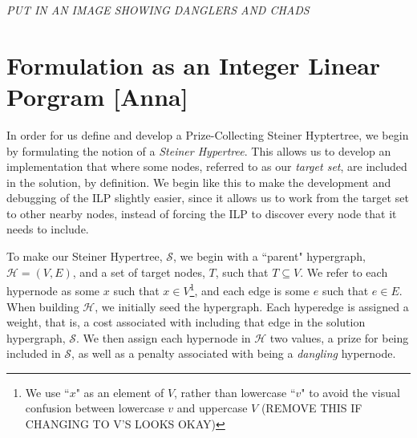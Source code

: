 \documentclass[12pt,twoside]{reedthesis}
\newcommand{\new}[2]{{\color{orange}#1 [#2]}}
\theoremstyle{definition}
\begin{document}
\textit{PUT IN AN IMAGE SHOWING DANGLERS AND CHADS}

\chapter{Formulation \new{as an Integer Linear Porgram}{Anna}}

In order for us define and develop a Prize-Collecting Steiner Hyptertree, we begin by formulating the notion of a \textit{Steiner Hypertree}. This allows us to develop an implementation that where some nodes, referred to as our \textit{target set}, are included in the solution, by definition. We begin like this to make the development and debugging of the ILP slightly easier, since it allows us to work from the target set to other nearby nodes, instead of forcing the ILP to discover every node that it needs to include.\par
To make our Steiner Hypertree, $\mathcal{S}$, we begin with a ``parent" hypergraph, $\mathcal{H} = (V,E)$, and a set of target nodes, $T$, such that $T \subseteq V$.  We refer to each hypernode as some $x$ such that $x \in V$\footnote{We use ``$x$" as an element of $V$, rather than lowercase ``$v$" to avoid the visual confusion between lowercase $v$ and uppercase $V$ (REMOVE THIS IF CHANGING TO V'S LOOKS OKAY)}, and each edge is some $e$ such that $e \in E$.  When building $\mathcal{H}$, we initially seed the hypergraph.  Each hyperedge is assigned a weight, that is, a cost associated with including that edge in the solution hypergraph, $\mathcal{S}$.  We then assign each hypernode in $\mathcal{H}$ two values, a prize for being included in $\mathcal{S}$, as well as a penalty associated with being a \textit{dangling} hypernode.\par
\end{document}
